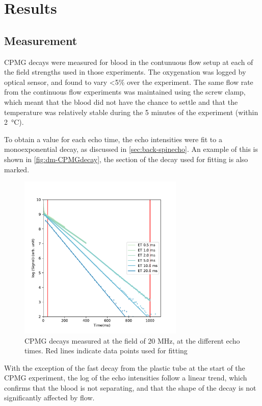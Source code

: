\section{Results}

\subsection{\Ttwo Measurement}
CPMG decays were measured for blood in the contunuous flow setup at each of the field strengths used in those experiments.
The oxygenation was logged by optical sensor, and found to vary <5\% over the experiment.
The same flow rate from the continuous flow experiments was maintained using the screw clamp, which meant that the blood did not have the chance to settle and that the temperature was relatively stable during the 5 minutes of the experiment (within \SI{2}{\celsius}).

To obtain a \Ttwo value for each echo time, the echo intensities were fit to a monoexponential decay, as discussed in \autoref{sec:back-spinecho}.
An example of this is shown in \autoref{fig:dm-CPMGdecay}, the section of the decay used for fitting is also marked.

\begin{figure}[ht]
\centering
\includegraphics[width=0.7\textwidth]{figures/diffmodels/20MHzT2fit.pdf}

\caption{CPMG decays measured at the field of 20 MHz, at the different echo times. Red lines indicate data points used for fitting}
\label{fig:dm-CPMGdecay}
\end{figure}

With the exception of the fast decay from the plastic tube at the start of the CPMG experiment, the log of the echo intensities follow a linear trend, which confirms that the blood is not separating, and that the shape of the decay is not significantly affected by flow.

